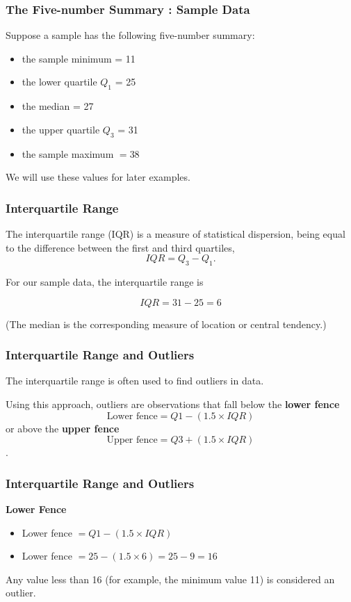 \documentclass{beamer}
\begin{document}
\begin{frame}
\frametitle{The Five-number Summary : Sample Data}
\Large
Suppose a sample has the following five-number summary: 
\begin{itemize}
\item the sample minimum = 11
\item the lower quartile $Q_1$ = 25
\item the median = 27
\item the upper quartile $Q_3$ = 31
\item the sample maximum $ = 38$
\end{itemize}
We will use these values for later examples.
\end{frame}
\begin{frame}
\frametitle{Interquartile Range}
\vspace{-0.5cm}
\Large
The interquartile range (IQR) is a measure of statistical dispersion, being equal to the difference between the first and third quartiles,
\[IQR = Q_3 -  Q_1. \]

For our sample data, the interquartile range is 

\[IQR = 31 -  25 = 6 \]

(The median is the corresponding measure of location or central tendency.)
\end{frame}
\begin{frame}
\frametitle{Interquartile Range and Outliers}
\Large
The interquartile range is often used to find outliers in data.

 Using this approach, outliers are observations that fall below the \textbf{lower fence} \[\mbox{Lower fence} = Q1 - (1.5\times IQR)\] or above the \textbf{upper fence} \[\mbox{Upper fence} = Q3 + (1.5 \times IQR)\].
\end{frame}
\begin{frame}
\frametitle{Interquartile Range and Outliers}
\Large
\textbf{Lower Fence}
\begin{itemize}
\item Lower fence $= Q1 - (1.5\times IQR)$
\item Lower fence $= 25 - (1.5\times 6) = 25 - 9 = 16$
\end{itemize}
Any value less than 16 (for example, the minimum value 11) is considered an outlier.\\
\vspace{0.5cm}
\end{frame}
\end{document}
